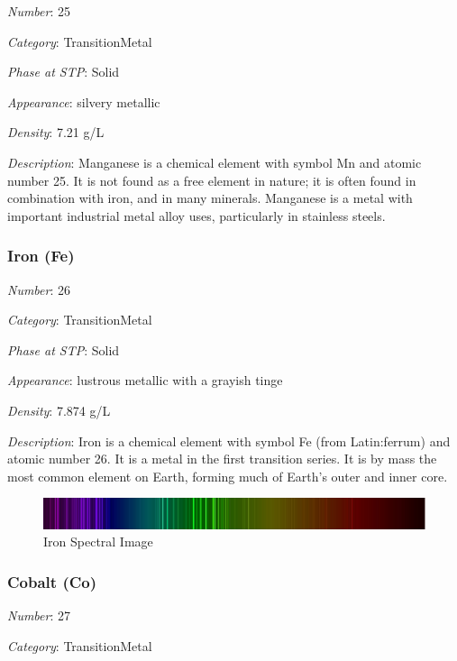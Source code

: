 \documentclass{article}
\begin{document}
\textit{Number}: 25

\textit{Category}: TransitionMetal

\textit{Phase at STP}: Solid

\textit{Appearance}: silvery metallic

\textit{Density}: 7.21 g/L

\textit{Description}: Manganese is a chemical element with symbol Mn and atomic number 25. It is not found as a free element in nature; it is often found in combination with iron, and in many minerals. Manganese is a metal with important industrial metal alloy uses, particularly in stainless steels.

\hypertarget{subsubsection::Fe}{}\subsubsection{Iron (Fe)}

\textit{Number}: 26

\textit{Category}: TransitionMetal

\textit{Phase at STP}: Solid

\textit{Appearance}: lustrous metallic with a grayish tinge

\textit{Density}: 7.874 g/L

\textit{Description}: Iron is a chemical element with symbol Fe (from Latin:ferrum) and atomic number 26. It is a metal in the first transition series. It is by mass the most common element on Earth, forming much of Earth's outer and inner core.

\immediate{}
\begin{figure}[!ht]
    \centering
    \includegraphics[width=12cm]{./resources/spectral_img/Iron_Spectrum.jpg}
    \caption{Iron Spectral Image}
\end{figure}

\hypertarget{subsubsection::Co}{}\subsubsection{Cobalt (Co)}

\textit{Number}: 27

\textit{Category}: TransitionMetal
\end{document}
